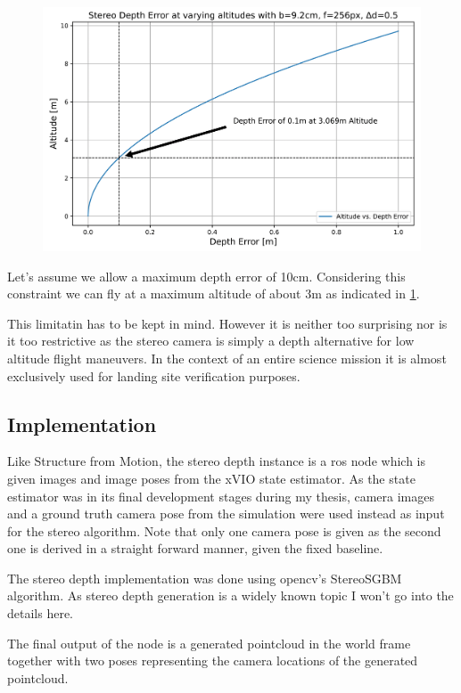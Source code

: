 \begin{figure}
    \centering
    \includegraphics[scale=0.19]{images/preparation/stereo_limit.png}
    \label{fig:stereo_limit}
\end{figure}

Let's assume we allow a maximum depth error of 10cm. Considering this constraint we can fly at a maximum altitude of about 3m as indicated in \cref{fig:stereo_limit}.

This limitatin has to be kept in mind. However it is neither too surprising nor is it too restrictive as the stereo camera is simply a depth alternative for low altitude flight maneuvers. In the context of an entire science mission it is almost exclusively used for landing site verification purposes.

\subsection{Implementation}

Like Structure from Motion, the stereo depth instance is a ros node which is given images and image poses from the xVIO state estimator. As the state estimator was in its final development stages during my thesis, camera images and a ground truth camera pose from the simulation were used instead as input for the stereo algorithm. Note that only one camera pose is given as the second one is derived in a straight forward manner, given the fixed baseline.

The stereo depth implementation was done using opencv's StereoSGBM algorithm. As stereo depth generation is a widely known topic I won't go into the details here.

The final output of the node is a generated pointcloud in the world frame together with two poses representing the camera locations of the generated pointcloud.

